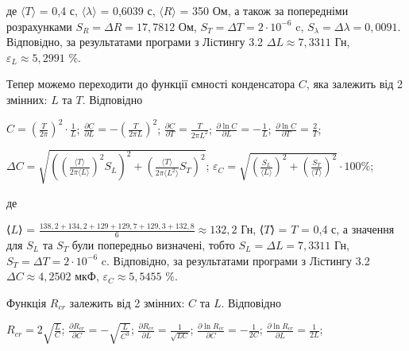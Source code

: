 \documentclass[12pt,a4paper]{article}
\begin{document}
    де $\text{⟨}T\text{⟩}$ = 0,4 с, $\text{⟨}\lambda\text{⟩}$ = 0,6039 с, $\text{⟨}R\text{⟩}$ = 350 Ом, а також за попередніми розрахунками $S_R = \Delta R = 17,7812$ Ом, $S_T = \Delta T = 2 \cdot 10^{-6}$ c,
    $S_{\lambda} = \Delta \lambda = 0,0091$. Вiдповiдно, за результатами програми з Лiстингу 3.2 $\Delta L \approx 7,3311$ Гн, $\varepsilon_L \approx 5,2991$ \%.

    Тепер можемо переходити до функції ємності конденсатора $C$, яка залежить від 2 змінних: $L$ та $T$. Відповідно

    \begin{center}
        $\displaystyle C = \left( \frac{T}{2\pi} \right)^2 \cdot \frac{1}{L}$; $\displaystyle \frac{\partial C}{\partial L} = -\left( \frac{T}{2\pi L} \right)^2$; $\displaystyle \frac{\partial C}{\partial T} = \frac{T}{2\pi L^2}$;
        $\displaystyle \frac{\partial \ln C}{\partial L} = -\frac{1}{L}$; $\displaystyle \frac{\partial \ln C}{\partial T} = \frac{2}{T}$;
    \end{center}

    \begin{center}
        $\displaystyle \Delta C = \sqrt{\left( \left( \frac{\text{⟨}T\text{⟩}}{2\pi\text{⟨}L\text{⟩}} \right)^2 S_{L} \right)^2 + \left( \frac{\text{⟨}T\text{⟩}}{2\pi\text{⟨}L^2\text{⟩}} S_T \right)^2}$;
        $\displaystyle \varepsilon_C = \sqrt{\left( \frac{S_{L}}{\text{⟨}L\text{⟩}} \right)^2 + \left( \frac{S_{T}}{\text{⟨}T\text{⟩}} \right)^2} \cdot 100 \%$;
    \end{center}

    де

    ⟨$L$⟩ = $\displaystyle \frac{138,2 + 134,2 + 129 + 129,7 + 129,3 + 132,8}{6} \approx 132,2$ Гн, ⟨$T$⟩ = $T$ = 0,4 с, а значення для $S_L$ та $S_T$ були попередньо визначені, тобто $S_{L} = \Delta L = 7,3311$ Гн,
    $S_T = \Delta T = 2 \cdot 10^{-6}$ c. Вiдповiдно, за результатами програми з Лiстингу 3.2 $\Delta C \approx 4,2502$ мкФ, $\varepsilon_C \approx 5,5455$ \%.

    Функція $R_{cr}$ залежить від 2 змінних: $C$ та $L$. Відповідно

    \begin{center}
        $\displaystyle R_{cr} = 2 \sqrt{\frac{L}{C}}$; $\displaystyle \frac{\partial R_{cr}}{\partial C} = -\sqrt{\frac{L}{C^3}}$; $\displaystyle \frac{\partial R_{cr}}{\partial L} = \frac{1}{\sqrt{LC}}$;
        $\displaystyle \frac{\partial \ln R_{cr}}{\partial C} = -\frac{1}{2C}$; $\displaystyle \frac{\partial \ln R_{cr}}{\partial L} = \frac{1}{2L}$;
    \end{center}
\end{document}

